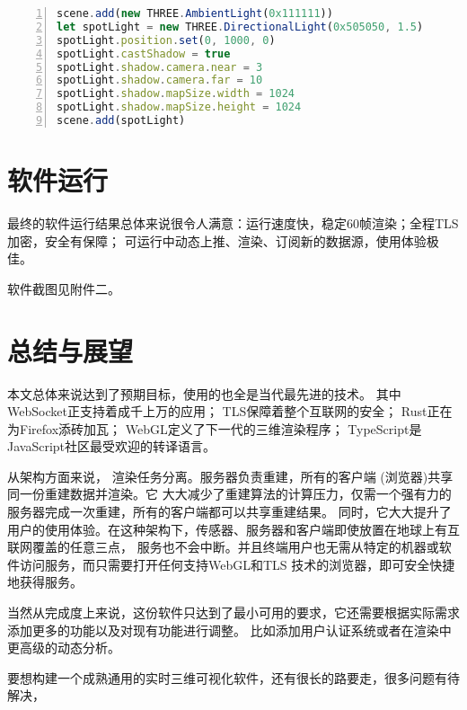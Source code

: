 \begin{lstlisting}[language=JavaScript,
   backgroundcolor=\color{lightgray},
   extendedchars=true,
   basicstyle=\footnotesize\ttfamily,
   showstringspaces=false,
   showspaces=false,
   numbers=left,
   numberstyle=\footnotesize,
   numbersep=9pt,
   tabsize=2,
   breaklines=true,
   showtabs=false,
   captionpos=b]
scene.add(new THREE.AmbientLight(0x111111))
let spotLight = new THREE.DirectionalLight(0x505050, 1.5)
spotLight.position.set(0, 1000, 0)
spotLight.castShadow = true
spotLight.shadow.camera.near = 3
spotLight.shadow.camera.far = 10
spotLight.shadow.mapSize.width = 1024
spotLight.shadow.mapSize.height = 1024
scene.add(spotLight)
\end{lstlisting}

\section{软件运行}
最终的软件运行结果总体来说很令人满意：运行速度快，稳定60帧渲染；全程TLS加密，安全有保障；
可运行中动态上推、渲染、订阅新的数据源，使用体验极佳。

软件截图见附件二。

\section{总结与展望}
本文总体来说达到了预期目标，使用的也全是当代最先进的技术。
其中WebSocket正支持着成千上万的应用；
TLS保障着整个互联网的安全；
Rust正在为Firefox添砖加瓦；
WebGL定义了下一代的三维渲染程序；
TypeScript是JavaScript社区最受欢迎的转译语言。

从架构方面来说，
渲染任务分离。服务器负责重建，所有的客户端 (浏览器)共享同一份重建数据并渲染。它
大大减少了重建算法的计算压力，仅需一个强有力的服务器完成一次重建，所有的客户端都可以共享重建结果。 
同时，它大大提升了用户的使用体验。在这种架构下，传感器、服务器和客户端即使放置在地球上有互联网覆盖的任意三点，
服务也不会中断。并且终端用户也无需从特定的机器或软件访问服务，而只需要打开任何支持WebGL和TLS
技术的浏览器，即可安全快捷地获得服务。

当然从完成度上来说，这份软件只达到了最小可用的要求，它还需要根据实际需求添加更多的功能以及对现有功能进行调整。
比如添加用户认证系统或者在渲染中更高级的动态分析。

要想构建一个成熟通用的实时三维可视化软件，还有很长的路要走，很多问题有待解决，
